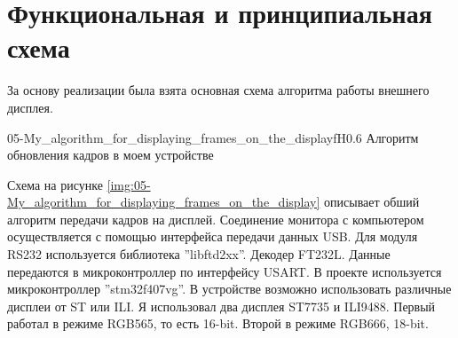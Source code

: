 \chapter{Функциональная и принципиальная схема}

	За основу реализации была взята основная схема алгоритма работы внешнего дисплея. 

	{05-My_algorithm_for_displaying_frames_on_the_display}{f}{H}{0.6\textwidth}
	{Алгоритм обновления кадров в моем устройстве} %
	
	Схема на рисунке \ref{img:05-My_algorithm_for_displaying_frames_on_the_display} описывает обший алгоритм передачи кадров на дисплей. Соединение монитора с компьютером осуществляется с помощью интерфейса передачи данных USB. Для модуля RS232 используется библиотека ''libftd2xx''. Декодер FT232L. Данные передаются в микроконтроллер по интерфейсу USART. В проекте используется микроконтроллер ''stm32f407vg''. В устройстве возможно использовать различные дисплеи от ST или ILI. Я использовал два дисплея ST7735 и ILI9488. Первый работал в режиме RGB565, то есть 16-bit. Второй в режиме RGB666, 18-bit.

